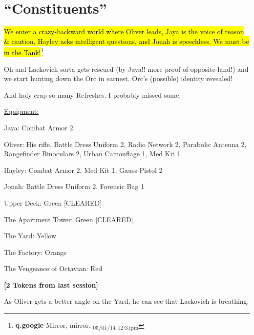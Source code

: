 \setcounter{chapter}{ 21 }
\chapter{\textbf{``Constituents''} }






\hl{We enter a crazy-backward world where Oliver leads, Jaya is the voice of reason \& caution, Hayley asks intelligent questions, and Jonah is speechless.  We must be in the Tank!}\footnote{\textbf{q.google }Mirror, mirror. \textsubscript{05/01/14 12:31pm}}



Oh and Lackovich sorta gets rescued (by Jaya!!  more proof of opposite-land!) and we start hunting down the Orc in earnest.  Orc's (possible) identity revealed!



And holy crap so many Refreshes.  I probably missed some.



\noindent\hrulefill






\underline{ Equipment: }

Jaya: Combat Armor 2

Oliver: His rifle, Battle Dress Uniform 2, Radio Network 2, Parabolic Antenna 2, Rangefinder Binoculars 2, Urban Camouflage 1, Med Kit 1

Hayley: Combat Armor 2, Med Kit 1, Gauss Pistol 2

Jonah: Battle Dress Uniform 2, Forensic Bag 1



Upper Deck: Green {[}CLEARED{]}

The Apartment Tower: Green {[}CLEARED{]}

The Yard: Yellow

The Factory: Orange

The Vengeance of Octavian: Red





\textbf{{[}2 Tokens from last session{]}}



As Oliver gets a better angle on the Yard, he can see that Lackovich is breathing.  




